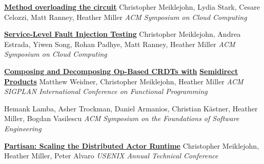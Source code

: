 \documentclass[9pt]{article}
\begin{document}
\noindent\href{https://dl.acm.org/doi/10.1145/3542929.3563466}{\bf Method overloading the circuit}
\newline\noindent Christopher Meiklejohn, Lydia Stark, Cesare Celozzi, Matt Ranney, Heather Miller
\newline\noindent\emph{ACM Symposium on Cloud Computing}
\bigskip

\noindent\href{https://dl.acm.org/doi/10.1145/3472883.3487005}{\bf Service-Level Fault Injection Testing}
\newline\noindent Christopher Meiklejohn, Andrea Estrada, Yiwen Song, Rohan Padhye, \vspace{-0.03in}
\newline\noindent Matt Ranney, Heather Miller
\newline\noindent\emph{ACM Symposium on Cloud Computing}
\bigskip

\noindent\href{https://arxiv.org/abs/2004.04303}{\bf Composing and Decomposing Op-Based CRDTs with}\vspace{-0.03in}
\newline\noindent\href{https://arxiv.org/abs/2004.04303}{\bf Semidirect Products}
\newline\noindent Matthew Weidner, Christopher Meiklejohn, Heather Miller
\newline\noindent\emph{ACM SIGPLAN International Conference on Functional Programming}
\bigskip

\vspace{-0.03in}
\newline{}
\newline\noindent Hemank Lamba, Asher Trockman, Daniel Armanios, Christian K\"{a}stner, \vspace{-0.03in}
\newline\noindent Heather Miller, Bogdan Vasilescu
\newline\noindent\emph{ACM Symposium on the Foundations of Software Engineering}
\bigskip

\noindent\href{https://www.usenix.org/system/files/atc19-meiklejohn.pdf}{\bf Partisan: Scaling the Distributed Actor Runtime}
\newline\noindent Christopher Meiklejohn, Heather Miller, Peter Alvaro
\newline\noindent\emph{USENIX Annual Technical Conference}
\bigskip
\end{document}
